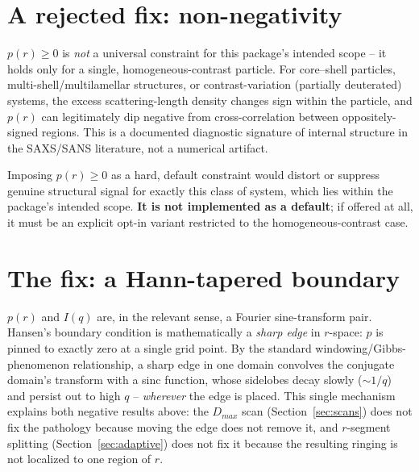 \documentclass[11pt,a4paper]{article}
\begin{document}
\section{A rejected fix: non-negativity}
\label{sec:nonneg}

$p(r) \ge 0$ is \emph{not} a universal constraint for this package's
intended scope -- it holds only for a single, homogeneous-contrast
particle. For core--shell particles, multi-shell/multilamellar
structures, or contrast-variation (partially deuterated) systems, the
excess scattering-length density changes sign within the particle, and
$p(r)$ can legitimately dip negative from cross-correlation between
oppositely-signed regions. This is a documented diagnostic signature
of internal structure in the SAXS/SANS literature, not a numerical
artifact.

Imposing $p(r) \ge 0$ as a hard, default constraint would distort or
suppress genuine structural signal for exactly this class of system,
which lies within the package's intended scope. \textbf{It is not
implemented as a default}; if offered at all, it must be an explicit
opt-in variant restricted to the homogeneous-contrast case.

\section{The fix: a Hann-tapered boundary}
\label{sec:hann}

$p(r)$ and $I(q)$ are, in the relevant sense, a Fourier sine-transform
pair. Hansen's boundary condition is mathematically a \emph{sharp
edge} in $r$-space: $p$ is pinned to exactly zero at a single grid
point. By the standard windowing/Gibbs-phenomenon relationship, a
sharp edge in one domain convolves the conjugate domain's transform
with a sinc function, whose sidelobes decay slowly ($\sim 1/q$) and
persist out to high $q$ -- \emph{wherever} the edge is placed. This
single mechanism explains both negative results above: the $D_{max}$
scan (Section~\ref{sec:scans}) does not fix the pathology because
moving the edge does not remove it, and $r$-segment splitting
(Section~\ref{sec:adaptive}) does not fix it because the resulting
ringing is not localized to one region of $r$.
\end{document}
